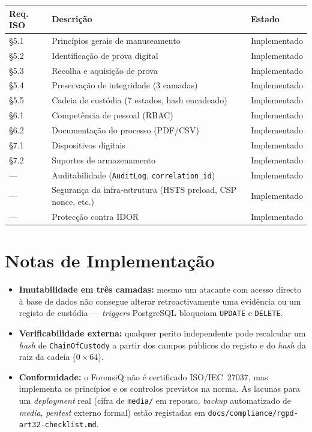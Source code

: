 \documentclass[a4paper,11pt]{article}
\begin{document}
\begin{longtable}{L{1.6cm} L{8.5cm} L{4cm}}
    \toprule
    \textbf{Req. ISO} & \textbf{Descrição} & \textbf{Estado} \\
    \midrule
    \endhead
    §5.1 & Princípios gerais de manuseamento & Implementado \\
    §5.2 & Identificação de prova digital & Implementado \\
    §5.3 & Recolha e aquisição de prova & Implementado \\
    §5.4 & Preservação de integridade (3 camadas) & Implementado \\
    §5.5 & Cadeia de custódia (7 estados, hash encadeado) & Implementado \\
    §6.1 & Competência de pessoal (RBAC) & Implementado \\
    §6.2 & Documentação do processo (PDF/CSV) & Implementado \\
    §7.1 & Dispositivos digitais & Implementado \\
    §7.2 & Suportes de armazenamento & Implementado \\
    --- & Auditabilidade (\texttt{AuditLog}, \texttt{correlation\_id}) & Implementado \\
    --- & Segurança da infra-estrutura (HSTS preload, CSP nonce, etc.) & Implementado \\
    --- & Protecção contra IDOR & Implementado \\
    \bottomrule
\end{longtable}

\section{Notas de Implementação}

\begin{itemize}
    \item \textbf{Imutabilidade em três camadas:} mesmo um atacante com
          acesso directo à base de dados não consegue alterar
          retroactivamente uma evidência ou um registo de custódia ---
          \emph{triggers} PostgreSQL bloqueiam \texttt{UPDATE} e
          \texttt{DELETE}.
    \item \textbf{Verificabilidade externa:} qualquer perito
          independente pode recalcular um \emph{hash} de
          \texttt{ChainOfCustody} a partir dos campos públicos do registo
          e do \emph{hash} da raiz da cadeia ($0 \times 64$).
    \item \textbf{Conformidade:} o ForensiQ não é certificado
          ISO/IEC~27037, mas implementa os princípios e os controlos
          previstos na norma. As lacunas para um \emph{deployment} real
          (cifra de \texttt{media/} em repouso, \emph{backup}
          automatizado de \emph{media}, \emph{pentest} externo formal)
          estão registadas em
          \texttt{docs/compliance/rgpd-art32-checklist.md}.
\end{itemize}
\end{document}

